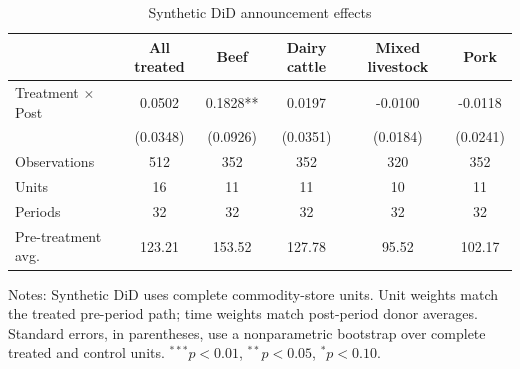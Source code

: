 \begin{table}[htbp]
\centering
\caption{Synthetic DiD announcement effects}
\label{tab:sdid}
\footnotesize
\setlength{\tabcolsep}{3pt}
\begin{tabular}{lccccc}
\hline\hline
 & All treated & Beef & Dairy cattle & Mixed livestock & Pork \\
\hline
Treatment $\times$ Post & 0.0502 & 0.1828** & 0.0197 & -0.0100 & -0.0118 \\
 & (0.0348) & (0.0926) & (0.0351) & (0.0184) & (0.0241) \\
\hline
Observations & 512 & 352 & 352 & 320 & 352 \\
Units & 16 & 11 & 11 & 10 & 11 \\
Periods & 32 & 32 & 32 & 32 & 32 \\
Pre-treatment avg. & 123.21 & 153.52 & 127.78 & 95.52 & 102.17 \\
\hline\hline
\end{tabular}
\begin{minipage}{0.96\linewidth}\footnotesize Notes: Synthetic DiD uses complete commodity-store units. Unit weights match the treated pre-period path; time weights match post-period donor averages. Standard errors, in parentheses, use a nonparametric bootstrap over complete treated and control units. $^{***}p<0.01$, $^{**}p<0.05$, $^{*}p<0.10$.\end{minipage}
\end{table}